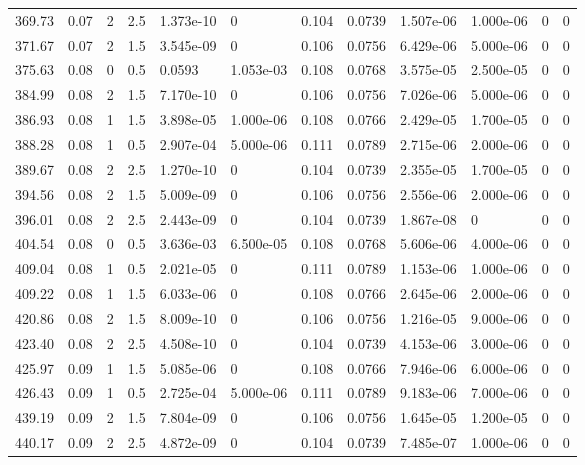 \documentclass[preview]{standalone}
\begin{document}
{{{\begin{tabular}{L{1.2cm}C{1.2cm} C{0.3cm}C{0.5cm} C{1.4cm}C{1.4cm} C{1.4cm}C{1.4cm} C{1.6cm}C{1.6cm} C{1.6cm}C{1.6cm}}
  369.73  &  0.07  & 2     & 2.5 &  1.373e-10  & 0  &  0.104&   0.0739& 1.507e-06 & 1.000e-06   &  0 & 0  \\ 
  371.67  &  0.07  & 2     & 1.5 &  3.545e-09  & 0  &  0.106&   0.0756& 6.429e-06 & 5.000e-06   &  0 & 0  \\ 
  375.63  &  0.08  & 0     & 0.5 &  0.0593  & 1.053e-03  &  0.108&   0.0768& 3.575e-05 & 2.500e-05   &  0 & 0  \\ 
  384.99  &  0.08  & 2     & 1.5 &  7.170e-10  & 0  &  0.106&   0.0756& 7.026e-06 & 5.000e-06   &  0 & 0  \\ 
  386.93  &  0.08  & 1     & 1.5 &  3.898e-05  & 1.000e-06  &  0.108&   0.0766& 2.429e-05 & 1.700e-05   &  0 & 0  \\ 
  388.28  &  0.08  & 1     & 0.5 &  2.907e-04  & 5.000e-06  &  0.111&   0.0789& 2.715e-06 & 2.000e-06   &  0 & 0  \\ 
  389.67  &  0.08  & 2     & 2.5 &  1.270e-10  & 0  &  0.104&   0.0739& 2.355e-05 & 1.700e-05   &  0 & 0  \\ 
  394.56  &  0.08  & 2     & 1.5 &  5.009e-09  & 0  &  0.106&   0.0756& 2.556e-06 & 2.000e-06   &  0 & 0  \\ 
  396.01  &  0.08  & 2     & 2.5 &  2.443e-09  & 0  &  0.104&   0.0739& 1.867e-08 & 0   &  0 & 0  \\ 
  404.54  &  0.08  & 0     & 0.5 &  3.636e-03  & 6.500e-05  &  0.108&   0.0768& 5.606e-06 & 4.000e-06   &  0 & 0  \\ 
  409.04  &  0.08  & 1     & 0.5 &  2.021e-05  & 0  &  0.111&   0.0789& 1.153e-06 & 1.000e-06   &  0 & 0  \\ 
  409.22  &  0.08  & 1     & 1.5 &  6.033e-06  & 0  &  0.108&   0.0766& 2.645e-06 & 2.000e-06   &  0 & 0  \\ 
  420.86  &  0.08  & 2     & 1.5 &  8.009e-10  & 0  &  0.106&   0.0756& 1.216e-05 & 9.000e-06   &  0 & 0  \\ 
  423.40  &  0.08  & 2     & 2.5 &  4.508e-10  & 0  &  0.104&   0.0739& 4.153e-06 & 3.000e-06   &  0 & 0  \\ 
  425.97  &  0.09  & 1     & 1.5 &  5.085e-06  & 0  &  0.108&   0.0766& 7.946e-06 & 6.000e-06   &  0 & 0  \\ 
  426.43  &  0.09  & 1     & 0.5 &  2.725e-04  & 5.000e-06  &  0.111&   0.0789& 9.183e-06 & 7.000e-06   &  0 & 0  \\ 
  439.19  &  0.09  & 2     & 1.5 &  7.804e-09  & 0  &  0.106&   0.0756& 1.645e-05 & 1.200e-05   &  0 & 0  \\ 
  440.17  &  0.09  & 2     & 2.5 &  4.872e-09  & 0  &  0.104&   0.0739& 7.485e-07 & 1.000e-06   &  0 & 0  \\ 

\end{tabular}}}}
\end{document}

